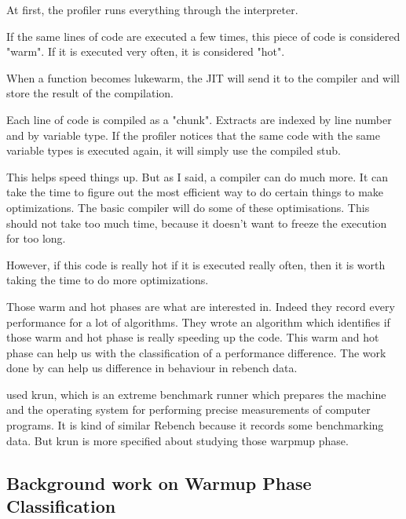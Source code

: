 \documentclass{article}
\begin{document}
At first, the profiler runs everything through the interpreter.

If the same lines of code are executed a few times, this piece of code is considered "warm". If it is executed very often, it is considered "hot".

When a function becomes lukewarm, the JIT will send it to the compiler and will store the result of the compilation.

Each line of code is compiled as a "chunk". Extracts are indexed by line number and by variable type. If the profiler notices that the same code with the same variable types is executed again, it will simply use the compiled stub.

This helps speed things up. But as I said, a compiler can do much more. It can take the time to figure out the most efficient way to do certain things to make optimizations. The basic compiler will do some of these optimisations. This should not take too much time, because it doesn't want to freeze the execution for too long.

However, if this code is really hot if it is executed really often, then it is worth taking the time to do more optimizations.

Those warm and hot phases are what \citep{barrett2017virtual} are interested in. Indeed they record every performance for a lot of algorithms. They wrote an algorithm which identifies if those warm and hot phase is really speeding up the code. This warm and hot phase can help us with the classification of a performance difference. The work done by \citep{barrett2017virtual} can help us difference in behaviour in rebench data.

\citep{barrett2017virtual} used krun, which is an extreme benchmark runner which prepares the machine and the operating system for performing precise measurements of computer programs. It is kind of similar Rebench because it records some benchmarking data. But krun is more specified about studying those warpmup phase.

\subsection{Background work on Warmup Phase Classification}
\end{document}
